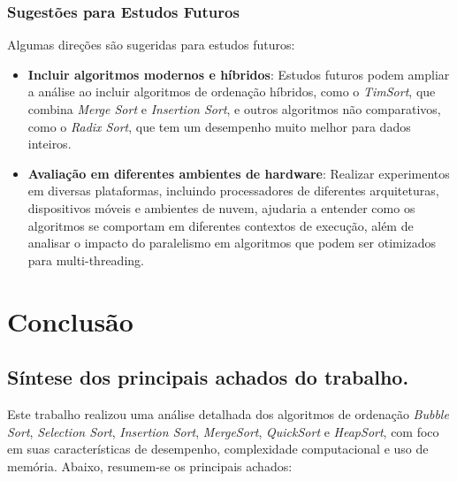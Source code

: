 \documentclass[a4paper,12pt]{article}
\begin{document}
\subsubsection{Sugestões para Estudos Futuros}
Algumas direções são sugeridas para estudos futuros:

\begin{itemize}
    \item \textbf{Incluir algoritmos modernos e híbridos}: Estudos futuros podem ampliar a análise ao incluir algoritmos de ordenação híbridos, como o \textit{TimSort}, que combina \textit{Merge Sort} e \textit{Insertion Sort}, e outros algoritmos não comparativos, como o \textit{Radix Sort}, que tem um desempenho muito melhor para dados inteiros.
    
    \item \textbf{Avaliação em diferentes ambientes de hardware}: Realizar experimentos em diversas plataformas, incluindo processadores de diferentes arquiteturas, dispositivos móveis e ambientes de nuvem, ajudaria a entender como os algoritmos se comportam em diferentes contextos de execução, além de analisar o impacto do paralelismo em algoritmos que podem ser otimizados para multi-threading.


    
\end{itemize}

\section{Conclusão}
\subsection{Síntese dos principais achados do trabalho.}
Este trabalho realizou uma análise detalhada dos algoritmos de ordenação \textit{Bubble Sort}, \textit{Selection Sort}, \textit{Insertion Sort}, \textit{MergeSort}, \textit{QuickSort} e \textit{HeapSort}, com foco em suas características de desempenho, complexidade computacional e uso de memória. Abaixo, resumem-se os principais achados:
\end{document}
